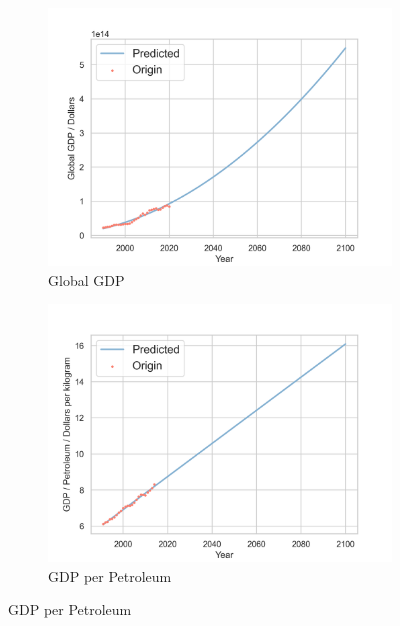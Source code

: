 \documentclass[12pt]{article}
\begin{document}
\begin{figure}[hbt]
    \centering
        \begin{subfigure}[]{0.4\textwidth}
            \includegraphics[width = \textwidth]{fig/projection/Global_GDP.png}
            \caption{Global GDP}
        \end{subfigure}
        \begin{subfigure}[]{0.4\textwidth}
            \includegraphics[width = \textwidth]{fig/projection/GDP__Petroleum.png}
            \caption{GDP per Petroleum}
        \end{subfigure}
    \end{figure}
\end{document}
